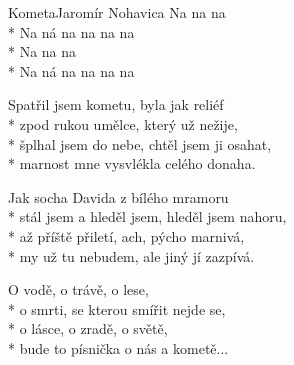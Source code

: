 \documentclass[10.5pt]{book}
\begin{document}
\begin{poem}{Kometa}{Jaromír Nohavica}
Na na na\\*
Na ná na na na na\\*
Na na na\\*
Na ná na na na na

Spatřil jsem kometu, byla jak reliéf\\*
zpod rukou umělce, který už nežije,\\*
šplhal jsem do nebe, chtěl jsem ji osahat,\\*
marnost mne vysvlékla celého donaha.

Jak socha Davida z bílého mramoru\\*
stál jsem a hleděl jsem, hleděl jsem nahoru,\\*
až příště přiletí, ach, pýcho marnivá,\\*
my už tu nebudem, ale jiný jí zazpívá.

O vodě, o trávě, o lese,\\*
o smrti, se kterou smířit nejde se,\\*
o lásce, o zradě, o světě,\\*
bude to písnička o nás a kometě...

\end{poem}
\end{document}
